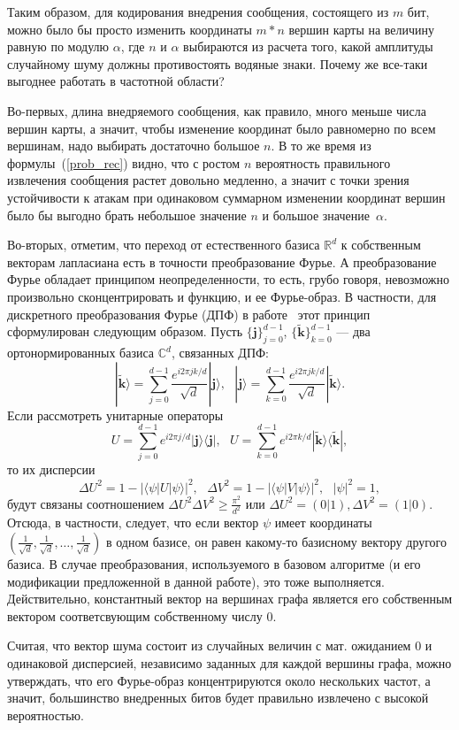 Таким образом, для кодирования внедрения сообщения, состоящего из $m$ бит, можно было бы просто изменить координаты $m * n$ вершин карты на величину равную по модулю $\alpha$, где
$n$ и $\alpha$ выбираются из расчета того, какой амплитуды случайному шуму должны противостоять водяные знаки. Почему же все-таки выгоднее работать в частотной области?

Во-первых, длина внедряемого сообщения, как правило, много меньше числа вершин карты, а значит, чтобы изменение координат было равномерно 
по всем вершинам, надо выбирать достаточно большое $n$. В то же время из формулы~(\ref{prob_rec}) видно, что с ростом $n$ вероятность 
правильного извлечения сообщения растет довольно медленно, а значит с точки зрения устойчивости к атакам при одинаковом 
суммарном изменении координат вершин было бы выгодно брать небольшое значение $n$ и большое значение~$\alpha$.

Во-вторых, отметим, что переход от естественного базиса $\mathbb{R}^d$ к собственным векторам лапласиана есть в точности преобразование Фурье. 
А преобразование Фурье обладает принципом неопределенности, то есть, грубо говоря, невозможно произвольно сконцентрировать и функцию, и ее Фурье-образ.
В частности, для дискретного преобразования Фурье (ДПФ) в работе~\cite{Uncertainty} этот принцип сформулирован следующим образом. 
Пусть $\{\mathbf{j}\}_{j=0}^{d-1}$, $\{\tilde{\mathbf{k}}\}_{k=0}^{d-1}$ --- два ортонормированных базиса $\mathbb{C}^d$, связанных ДПФ:
\begin{equation*}
\textstyle |\tilde{\mathbf{k}} \rangle = \sum\limits_{j=0}^{d-1} \frac{e^{i 2\pi j k / d}}{\sqrt{d}} |\mathbf{j} \rangle,\mbox{    }
|{\mathbf{j}} \rangle = \sum\limits_{k=0}^{d-1} \frac{e^{i 2\pi j k / d}}{\sqrt{d}} |\tilde{\mathbf{k}} \rangle.
\end{equation*}
Если рассмотреть унитарные операторы 
$$
U = \sum\limits_{j=0}^{d-1} e^{i 2\pi j / d} |\mathbf{j} \rangle \langle \mathbf{j} |,\mbox{    }
U = \sum\limits_{k=0}^{d-1} e^{i 2\pi k / d} |\tilde{\mathbf{k}} \rangle \langle \tilde{\mathbf{k}} |,
$$
то их дисперсии
$$
\textstyle
\Delta U^2 = 1 - |\langle \psi | U | \psi \rangle |^2, \mbox{   }
\Delta V^2 = 1 - |\langle \psi | V | \psi \rangle |^2, \mbox{   } |\psi|^2 = 1,
$$
будут связаны соотношением $\Delta U^2 \Delta V^2 \ge \frac{\pi^2}{d^2}$ или $\Delta U^2 = (0|1), \Delta V^2 = (1|0)$. 
Отсюда, в частности, следует, что если вектор $\psi$ имеет координаты 
$\left(\frac{1}{\sqrt{d}}, \frac{1}{\sqrt{d}}, \ldots, \frac{1}{\sqrt{d}}\right)$ в одном базисе, он равен какому-то базисному вектору другого базиса.
В случае преобразования, используемого в базовом алгоритме (и его модификации предложенной в данной работе), это тоже выполняется. 
Действительно, константный вектор на вершинах графа является его собственным вектором соответсвующим собственному числу $0$.

Считая, что вектор шума состоит из случайных величин с мат. ожиданием $0$ и одинаковой дисперсией, независимо заданных для каждой вершины графа, 
можно утверждать, что его Фурье-образ концентрируются около нескольких частот, а значит, большинство внедренных битов будет правильно извлечено
с высокой вероятностью.
